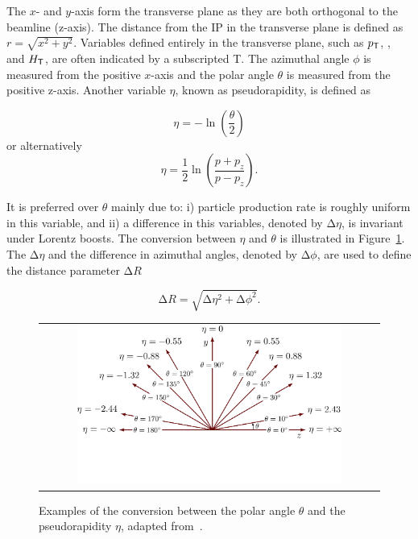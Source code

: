 The $x$- and $y$-axis form the transverse plane as they are both orthogonal to the beamline (z-axis). The distance from the \ac{IP} in the transverse plane is defined as $r=\sqrt{x^2+y^2}$. Variables defined entirely in the transverse plane, such as $p_{\textsf{T}}$, \MET, and $H_{\textsf{T}}$, are often indicated by a subscripted T. The azimuthal angle $\phi$ is measured from the positive $x$-axis and the polar angle $\theta$ is measured from the positive z-axis. Another variable $\eta$, known as pseudorapidity, is defined as

\begin{equation}
\eta=-\ln(\frac{\theta}{2}) 
\end{equation}
or alternatively 
\begin{equation}
\eta=\frac{1}{2}\ln(\frac{p+p_z}{p-p_z}).
\label{eq:eta}
\end{equation}

It is preferred over $\theta$ mainly due to: i) particle production rate is roughly uniform in this variable, and ii) a difference in this variables, denoted by $\mathrm{\Delta}\eta$, is invariant under Lorentz boosts. The conversion between $\eta$ and $\theta$ is illustrated in Figure~\ref{fig:axis2D}. The $\mathrm{\Delta}\eta$ and the difference in azimuthal angles, denoted by $\mathrm{\Delta}\phi$, are used to define the distance parameter $\mathrm{\Delta}R$

\begin{equation}
\label{eq:DR}
\mathrm{\Delta}R=\sqrt{\mathrm{\Delta}\eta^2+\mathrm{\Delta}\phi^2}.
\end{equation}

\begin{figure}[tbh!]
 \begin{center}
 \begin{tabular}{c}
 \includegraphics[width=0.8\textwidth]{figures/Part2/CMS/axis2D_pseudorapidity-003}
 \end{tabular}
 \caption{Examples of the conversion between the polar angle $\theta$ and the pseudorapidity $\eta$, adapted from~\cite{tikz:2D}.}
 \label{fig:axis2D}
 \end{center}
\end{figure}

